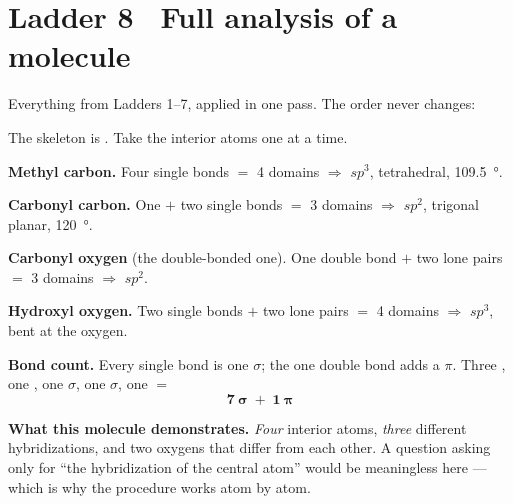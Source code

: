 \documentclass{apchem-worksheet}
\begin{document}
\section*{\sffamily Ladder 8 \textbullet\ Full analysis of a molecule}

Everything from Ladders 1--7, applied in one pass. The order never
changes:

\begin{center}
\end{center}

\begin{workedexample}
The skeleton is . Take the interior atoms one at a
time.

\textbf{Methyl carbon.} Four single bonds $=$ 4 domains $\Rightarrow$
\textbf{$sp^{3}$}, tetrahedral, \SI{109.5}{\degree}.

\textbf{Carbonyl carbon.} One  $+$ two single bonds $=$
3 domains $\Rightarrow$ \textbf{$sp^{2}$}, trigonal planar,
\SI{120}{\degree}.

\textbf{Carbonyl oxygen} (the double-bonded one). One double bond $+$
two lone pairs $=$ 3 domains $\Rightarrow$ \textbf{$sp^{2}$}.

\textbf{Hydroxyl oxygen.} Two single bonds $+$ two lone pairs $=$
4 domains $\Rightarrow$ \textbf{$sp^{3}$}, bent at the oxygen.

\textbf{Bond count.} Every single bond is one $\sigma$; the one double
bond adds a $\pi$. Three , one , one  $\sigma$,
one  $\sigma$, one  $=$
\[ \mathbf{7~\sigma \;+\; 1~\pi} \]

\textbf{What this molecule demonstrates.} \emph{Four} interior atoms,
\emph{three} different hybridizations, and two oxygens that differ from
each other. A question asking only for ``the hybridization of the
central atom'' would be meaningless here --- which is why the procedure
works atom by atom.
\end{workedexample}
\end{document}

